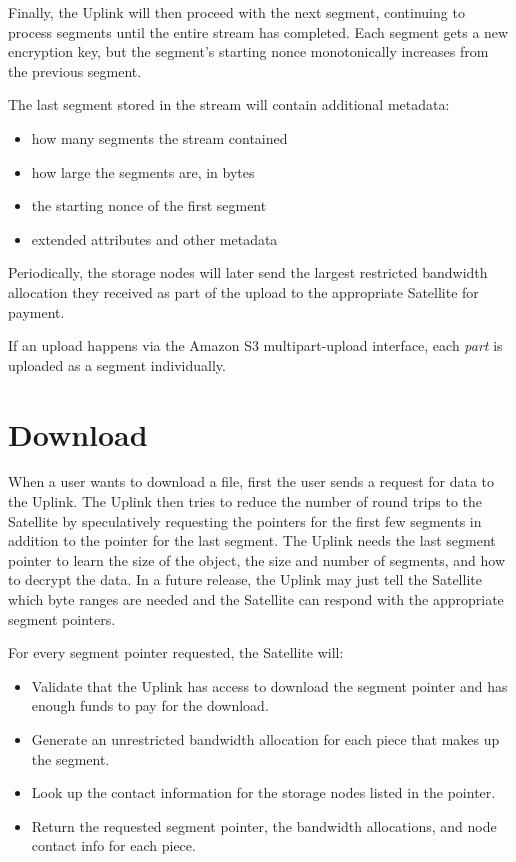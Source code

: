 \documentclass[8pt,fleqn,openany]{book}
\begin{document}
Finally, the Uplink will then proceed with the next segment, continuing to
process segments until the entire stream has completed. Each segment gets
a new encryption key, but the segment's starting nonce monotonically increases
from the previous segment.

The last segment stored in the stream will contain additional metadata:
\begin{itemize}
\item how many segments the stream contained
\item how large the segments are, in bytes
\item the starting nonce of the first segment
\item extended attributes and other metadata
\end{itemize}

Periodically, the storage nodes will later send the largest restricted
bandwidth allocation they received as part of the upload to the appropriate
Satellite for payment.

If an upload happens via the Amazon S3 multipart-upload interface, each
{\em part} is uploaded as a segment individually.

\section{Download}

When a user wants to download a file, first the user sends a request for
data to the Uplink.
  The Uplink then tries to reduce the number of round trips to the Satellite
  by speculatively requesting the pointers for the first few segments in
  addition to the pointer for the last segment. The Uplink needs the last
  segment pointer to learn the size of the object, the size and number of segments,
  and how to decrypt the data. In a future release, the Uplink may just tell
  the Satellite which byte ranges are needed and the Satellite can respond with
  the appropriate segment pointers.

For every segment pointer requested, the Satellite will:
  \begin{itemize}
  \item Validate that the Uplink has access to download the segment pointer
    and has enough funds to pay for the download.
  \item Generate an unrestricted bandwidth allocation for each piece that
    makes up the segment.
  \item Look up the contact information for the storage nodes listed in the
  pointer.
  \item Return the requested segment pointer, the bandwidth allocations, and
    node contact info for each piece.
  \end{itemize}
\end{document}
